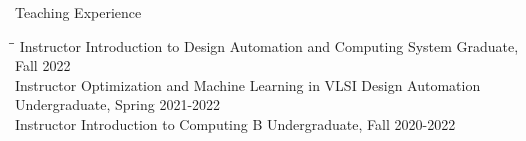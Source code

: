 \begin{rSection}{Teaching Experience}

\begin{tabbing}
\hspace{0.8in}\= \hspace{4.2in}\= \kill
Instructor \> Introduction to Design Automation and Computing System \> Graduate, Fall 2022 \\
Instructor \> Optimization and Machine Learning in VLSI Design Automation \> Undergraduate, Spring 2021-2022 \\
Instructor \> Introduction to Computing B \> Undergraduate, Fall 2020-2022 \\
\end{tabbing}

\end{rSection}
